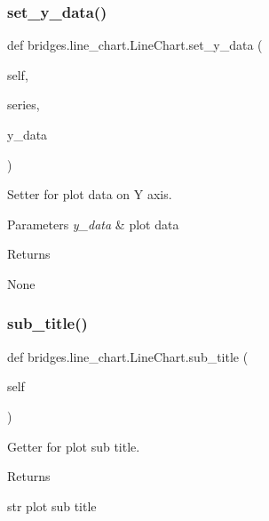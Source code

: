 \subsubsection{\texorpdfstring{set\+\_\+y\+\_\+data()}{set\_y\_data()}}
{\footnotesize\ttfamily def bridges.\+line\+\_\+chart.\+Line\+Chart.\+set\+\_\+y\+\_\+data (\begin{DoxyParamCaption}\item[{}]{self,  }\item[{}]{series,  }\item[{}]{y\+\_\+data }\end{DoxyParamCaption})}



Setter for plot data on Y axis. 


\begin{DoxyParams}{Parameters}
{\em y\+\_\+data} & plot data \\
\hline
\end{DoxyParams}
\begin{DoxyReturn}{Returns}


None 
\end{DoxyReturn}
\mbox{\label{classbridges_1_1line__chart_1_1_line_chart_a3361674c961f45bfa058cff38ba49bd8}} 
\subsubsection{\texorpdfstring{sub\+\_\+title()}{sub\_title()}\hspace{0.1cm}{\footnotesize\ttfamily [1/2]}}
{\footnotesize\ttfamily def bridges.\+line\+\_\+chart.\+Line\+Chart.\+sub\+\_\+title (\begin{DoxyParamCaption}\item[{}]{self }\end{DoxyParamCaption})}



Getter for plot sub title. 

\begin{DoxyReturn}{Returns}


str plot sub title 
\end{DoxyReturn}
\mbox{\label{classbridges_1_1line__chart_1_1_line_chart_ac26e0a4de0438a5463ba5dca95d2b0a3}} 
